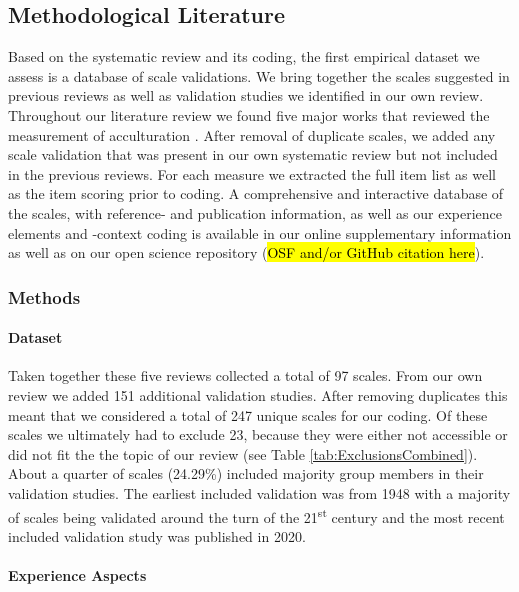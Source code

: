 

\subsection{Methodological Literature}

Based on the systematic review and its coding, the first empirical
dataset we assess is a database of scale validations. We bring together
the scales suggested in previous reviews as well as validation studies
we identified in our own review. Throughout our literature review we
found five major works that reviewed the measurement of acculturation
\citep{Celenk2011, Maestas2000, Matsudaira2006, Wallace2010, Zane2004}.
After removal of duplicate scales, we added any scale validation that
was present in our own systematic review but not included in the
previous reviews. For each measure we extracted the full item list as
well as the item scoring prior to coding. A comprehensive and
interactive database of the scales, with reference- and publication
information, as well as our experience elements and -context coding is
available in our online supplementary information as well as on our open
science repository (\hl{OSF and/or GitHub citation here}).

\subsubsection{Methods}  
\paragraph{Dataset}

Taken together these five reviews collected a total of 97 scales. From
our own review we added 151 additional validation studies. After
removing duplicates this meant that we considered a total of 247 unique
scales for our coding. Of these scales we ultimately had to exclude 23,
because they were either not accessible or did not fit the the topic of
our review (see Table \ref{tab:ExclusionsCombined}). About a quarter of
scales (24.29\%) included majority group members in their validation
studies. The earliest included validation was from 1948 with a majority
of scales being validated around the turn of the 21\textsuperscript{st}
century and the most recent included validation study was published in
2020.

\paragraph{Experience Aspects}

